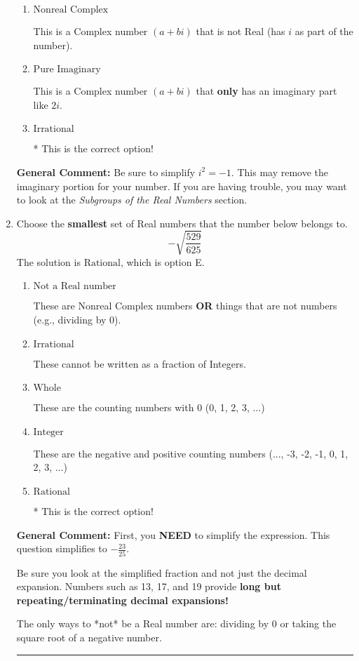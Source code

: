 \documentclass{extbook}[14pt]
\newcommand{\litem}[1]{\item #1

\rule{\textwidth}{0.4pt}}
\begin{document}
\begin{enumerate}
{\begin{enumerate}[label=\Alph*.]
This is not a number. The only non-Complex number we know is dividing by 0 as this is not a number!
\item \( \text{Nonreal Complex} \)

This is a Complex number $(a+bi)$ that is not Real (has $i$ as part of the number).
\item \( \text{Pure Imaginary} \)

This is a Complex number $(a+bi)$ that \textbf{only} has an imaginary part like $2i$.
\item \( \text{Irrational} \)

* This is the correct option!
\end{enumerate}

\textbf{General Comment:} Be sure to simplify $i^2 = -1$. This may remove the imaginary portion for your number. If you are having trouble, you may want to look at the \textit{Subgroups of the Real Numbers} section.
}
\litem{
Choose the \textbf{smallest} set of Real numbers that the number below belongs to.
\[ -\sqrt{\frac{529}{625}} \]The solution is \( \text{Rational} \), which is option E.\begin{enumerate}[label=\Alph*.]
\item \( \text{Not a Real number} \)

These are Nonreal Complex numbers \textbf{OR} things that are not numbers (e.g., dividing by 0).
\item \( \text{Irrational} \)

These cannot be written as a fraction of Integers.
\item \( \text{Whole} \)

These are the counting numbers with 0 (0, 1, 2, 3, ...)
\item \( \text{Integer} \)

These are the negative and positive counting numbers (..., -3, -2, -1, 0, 1, 2, 3, ...)
\item \( \text{Rational} \)

* This is the correct option!
\end{enumerate}

\textbf{General Comment:} First, you \textbf{NEED} to simplify the expression. This question simplifies to $-\frac{23}{25}$. 
 
 Be sure you look at the simplified fraction and not just the decimal expansion. Numbers such as 13, 17, and 19 provide \textbf{long but repeating/terminating decimal expansions!} 
 
 The only ways to *not* be a Real number are: dividing by 0 or taking the square root of a negative number. 
 
}
\end{enumerate}
\end{document}
